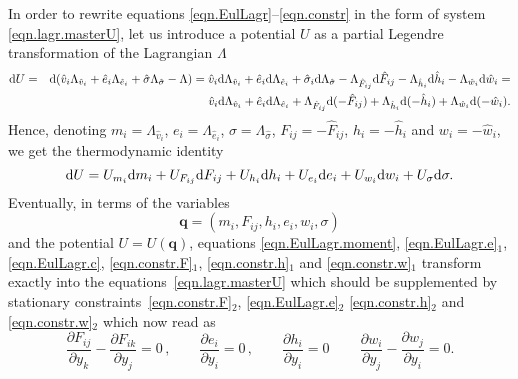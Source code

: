 \documentclass[twoside]{article}
\newcommand{\qq}{{\boldsymbol{q}}}
\newcommand{\pd}{\partial}
\newcommand{\IP}[1]{ \textcolor{blue}   {\small\texttt{
\texttt{[image: pin\_small.jpeg]} Ilya: #1}} }
\newcommand{\MP}[1]{ \textcolor{Green}   {\small\texttt{
\texttt{[image: pin\_small.jpeg]} Michal: #1}} }
\begin{document}
In order to rewrite equations \eqref{eqn.EulLagr}--\eqref{eqn.constr} 
in the form of system \eqref{eqn.lagr.masterU}, let us introduce a 
potential $U$ as a partial Legendre transformation of the Lagrangian $ \Lambda $
\begin{eqnarray}
{\rm d}U&=&{\rm d}(\hat{v}_i 
\Lambda_{\hat{v}_i}+\hat{e}_i\Lambda_{\hat{e}_i}+\hat{\sigma}\Lambda_{\hat{\sigma}}
 -\Lambda)=
\hat{v}_i{\rm d}\Lambda_{\hat{v}_i}+\hat{e}_i {\rm d}
\Lambda_{\hat{e}_i} +\hat{\sigma}_i {\rm d}
\Lambda_{\hat{\sigma}} -\Lambda_{\hat{F}_{ij}} {\rm d}
\hat{F}_{ij} - \Lambda_{\hat{h}_i} {\rm d} \hat{h}_i - \Lambda_{\hat{w}_i} {\rm 
d} \hat{w}_i=
\nonumber \\
&&
\hat{v}_i{\rm d}\Lambda_{\hat{v}_i}+\hat{e}_i {\rm d} \Lambda_{\hat{e}_i} +  
\Lambda_{\hat{F}_{ij}} {\rm d} (-\hat{F}_{ij})  + \Lambda_{\hat{h}_i} {\rm d} 
(-\hat{h}_i) + \Lambda_{\hat{w}_i} {\rm d} 
(-\hat{w}_i).
\end{eqnarray}
Hence, denoting $m_i=\Lambda_{\hat{v}_i} $, $e_i=\Lambda_{\hat{e}_i}$, 
$\sigma=\Lambda_{\hat{\sigma}}$, $ 
F_{ij}=-\hat{F}_{ij} $, $ h_i=-\hat{h}_i $ and $ w_i=-\hat{w}_i $,
we get the thermodynamic identity 
\begin{equation*}
{\rm d}U=U_{m_i} {\rm d} m_i + U_{F_{ij}} {\rm d} F_{ij}  
+ U_{h_{i}}{\rm d} h_{i} + U_{e_i} {\rm d} e_i + U_{w_{i}}{\rm d} w_{i} + 
U_{\sigma} {\rm d} \sigma.
\end{equation*}
Eventually, in terms of the variables
\begin{equation}\label{eqn.VarConsLagr}
\qq=(m_i,F_{ij},h_i,e_{i},w_i,\sigma)
\end{equation}
and the potential $ U=U(\qq) $, equations \eqref{eqn.EulLagr.moment}, 
\eqref{eqn.EulLagr.e}$_1$, \eqref{eqn.EulLagr.c}, \eqref{eqn.constr.F}$ _1 $, 
\eqref{eqn.constr.h}$ _1 $ 
and \eqref{eqn.constr.w}$ _1 $
transform exactly into the equations~\eqref{eqn.lagr.masterU} which should be 
supplemented by stationary constraints~\eqref{eqn.constr.F}$ _2 $, 
\eqref{eqn.EulLagr.e}$ _2 $ 
\eqref{eqn.constr.h}$ _2 $ and \eqref{eqn.constr.w}$ _2 $ which now read as
\begin{equation}\label{eqn.constr.u}
\dfrac{\pd F_{ij}}{\pd y_k}-\dfrac{\pd F_{ik}}{\pd y_j} = 
0\,,\qquad \dfrac{\pd e_i}{\pd y_i}=0\,, \qquad \dfrac{\pd h_i}{\pd y_i}=0\, 
\qquad \dfrac{\pd w_i}{\pd y_j} - \dfrac{\pd w_j}{\pd y_i} = 0.
\end{equation}

\end{document}
